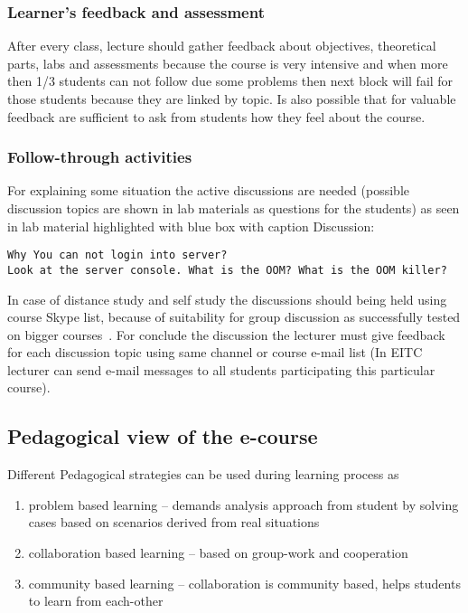 \subsubsection{Learner's feedback and assessment}
After every class, lecture should gather feedback about objectives, theoretical parts, labs and assessments because the course is very intensive and when more then 1/3 students can not follow due some problems then next block will fail for those students because they are linked by topic.
Is also possible that for valuable feedback are sufficient to ask from students how they feel about the course.

\subsubsection{Follow-through activities}
For explaining some situation the active discussions are needed (possible discussion topics are shown in lab materials as questions for the students) as seen in lab material highlighted with blue box with caption Discussion:
\begin{Verbatim}[frame=single,
label=Discussion,framesep=2mm,rulecolor=\color{blue},commandchars=\\\{\}]
Why You can not login into server?
Look at the server console. What is the OOM? What is the OOM killer?
\end{Verbatim}
In case of distance study and self study the discussions should being held using course Skype list, because of suitability for group discussion as successfully tested on bigger courses~\citep{website:kakk_teistmoodi_e}. For conclude the discussion the lecturer must give feedback for each discussion topic using same channel or course e-mail list (In \gls{EITC} lecturer can send e-mail messages to all students participating this particular course).



\subsection{Pedagogical view of the e-course}
Different Pedagogical strategies can be used during learning process as \citep{OppeArenduskeskus2010}
\begin{enumerate}
\item problem based learning -- demands analysis approach from student by solving cases based on scenarios derived from real situations
\item collaboration based learning -- based on group-work and cooperation
\item community based learning -- collaboration is community based, helps students to learn from each-other
\end{enumerate}

